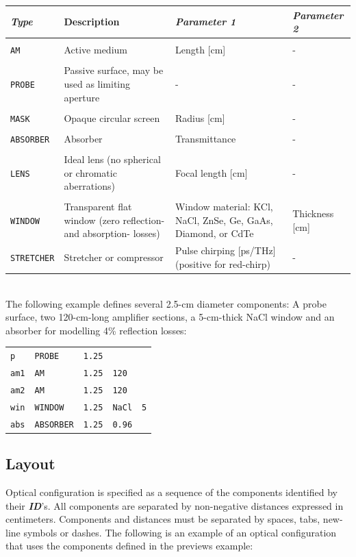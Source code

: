 \documentclass{report}
\begin{document}
\def\tabularxcolumn#1{m{#1}}
\begin{tabularx}{\textwidth}{|l|X|X|X|}
\hline 
\textit{\textbf{Type}} & Description & \textit{\textbf{Parameter 1}} & \textit{\textbf{Parameter 2}} \\
\hline 
&&&\\
\texttt{AM}	& Active medium	& Length [cm]	& - \\
&&&\\
\texttt{PROBE} & Passive surface, may be used as limiting aperture &	- &	-\\
&&&\\
\texttt{MASK} & Opaque circular screen & Radius [cm] & -\\
&&&\\
\texttt{ABSORBER} & Absorber & Transmittance & -\\
&&&\\
\texttt{LENS} & Ideal lens (no spherical or chromatic aberrations)& Focal length [cm]& -\\
&&&\\
\texttt{WINDOW} & Transparent flat window (zero reflection- and absorption- losses) & Window material: KCl, NaCl, ZnSe, Ge, GaAs, Diamond, or CdTe & Thickness [cm]\\

\texttt{STRETCHER} & Stretcher or compressor & Pulse chirping [ps/THz] (positive for red-chirp) & -\\
\hline
\end{tabularx}\\


The following example defines several 2.5-cm diameter components: A probe surface, two 120-cm-long amplifier sections, a 5-cm-thick NaCl window and an absorber for modelling 4\% reflection losses:

\bigskip
\begin{tabular}{lllll}
\texttt{p}   & \texttt{PROBE}    & \texttt{1.25} &               &           \\
\texttt{am1} & \texttt{AM}       & \texttt{1.25} & \texttt{120}  &           \\
\texttt{am2} & \texttt{AM}       & \texttt{1.25} & \texttt{120}  &           \\
\texttt{win} & \texttt{WINDOW}   & \texttt{1.25} & \texttt{NaCl} & \texttt{5}\\
\texttt{abs} & \texttt{ABSORBER} & \texttt{1.25} & \texttt{0.96} &
\end{tabular}

\subsection{Layout}
Optical configuration is specified as a sequence of the components identified by their \textit{\textbf{ID}}’s. All components are separated by non-negative distances expressed in centimeters. Components and distances must be separated by spaces, tabs, new-line symbols or dashes. The following is an example of an optical configuration that uses the components defined in the previews example:
\end{document}
